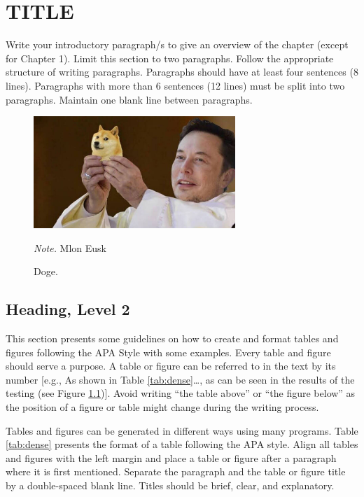 \setlength{\footskip}{8mm}

\chapter{TITLE}

Write your introductory paragraph/s to give an overview of the chapter (except for Chapter 1). Limit this section to two paragraphs. Follow the appropriate structure of writing paragraphs. Paragraphs should have at least four sentences (8 lines). Paragraphs with more than 6 sentences (12 lines) must be split into two paragraphs.  Maintain one blank line between paragraphs.

\begin{figure}
\caption{Doge.}
\centerline{\includegraphics[width=3in]{figures/doge.jpeg}}
\label{fig:doge}
\small{\textit{Note.} Mlon Eusk}
\end{figure}

\section{Heading, Level 2}

This section presents some guidelines on how to create and format tables and figures following the APA Style with some examples. Every table and figure should serve a purpose. A table or figure can be referred to in the text by its number [e.g., As shown in Table \ref{tab:dense}…, as can be seen in the results of the testing (see Figure \ref{fig:doge})].  Avoid writing “the table above” or “the figure below” as the position of a figure or table might change during the writing process.

Tables and figures can be generated in different ways using many programs.  Table \ref{tab:dense} presents the format of a table following the APA style. Align all tables and figures with the left margin and place a table or figure after a paragraph where it is first mentioned. Separate the paragraph and the table or figure title by a double-spaced blank line. Titles should be brief, clear, and explanatory. 

